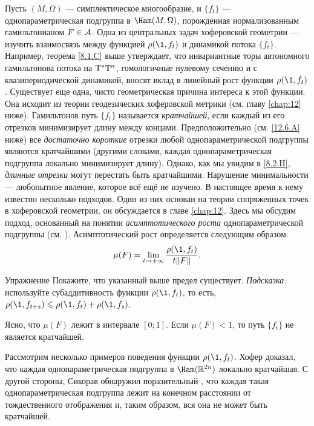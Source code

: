 Пусть $(M, \Omega)$ --- симплектическое многообразие, и $\{f_t\}$ ---
однопараметрическая подгруппа в $\Ham (M, \Omega)$, порожденная
нормализованным гамильтонианом $F \in \mathcal{A}$. 
Одна из центральных задач хоферовской геометрии --- изучить
взаимосвязь между функцией $\rho (\1, f_t)$ и динамикой потока
$\{f_t\}$.
Например, теорема \ref{8.1.C} выше утверждает, что инвариантные торы
автономного гамильтонова потока на $\mathrm{T}^\ast \mathbb{T}^n$,  гомологичные
нулевому сечению и с квазипериодической динамикой, вносят вклад в
линейный рост функции $\rho (\1, f_t)$. 
Существует еще одна, чисто геометрическая причина интереса к этой функции.
Она исходит из теории геодезических хоферовской метрики (см. главу
\ref{chap:12} ниже). 
Гамильтонов путь $\{f_t\}$ называется \emph{кратчайшей}, если каждый из его отрезков минимизирует длину между  концами.\?{}{}
Предположительно (см. \ref{12.6.A} ниже) все {}\emph{достаточно короткие}
отрезки любой однопараметрической подгруппы являются кратчайшими
(другими словами, каждая однопараметрическая подгруппа локально
минимизирует длину). 
Однако, как мы увидим в \ref{8.2.H}, {}\emph{длинные отрезки} могут перестать
быть кратчайшими. 
Нарушение минимальности --- любопытное явление, которое всё ещё не изучено.
В настоящее время к нему известно несколько подходов.
Один из них основан на теории сопряженных точек в хоферовской
геометрии, он обсуждается в главе \ref{chap:12}. 
Здесь мы обсудим подход, основанный на понятии \emph{асимптотического роста}
однопараметрической подгруппы (см. \cite{BP2}). 
Асимптотический рост определяется следующим образом: 
\[\mu(F)=\lim_{t \to + \infty}\frac{\rho (\1, f_t)}{ t \| F \|}.\]

\begin{ex*}{Упражнение}
Покажите, что указанный выше предел существует.
\emph{Подсказка:} используйте субаддитивность функции $\rho (\1, f_t)$, то есть, $\rho (\1, f_{t + s}) \le \rho (\1, f_t) + \rho (\1, f_s)$. 
\end{ex*}

Ясно, что $\mu (F)$ лежит в интервале $[0; 1]$.
Если $\mu (F) <1$, то путь $\{f_t\}$ не является кратчайшей.

Рассмотрим несколько примеров поведения функции $\rho (\1, f_t)$.
Хофер \cite{H2} доказал, что каждая однопараметрическая подгруппа в
$\Ham (\RR^{2n})$ локально кратчайшая. 
С другой стороны, Сикорав \cite{S2} обнаружил поразительный
, что каждая такая
однопараметрическая подгруппа лежит на конечном расстоянии от
тождественного отображения и, таким образом, вся она не может быть
кратчайшей. 

